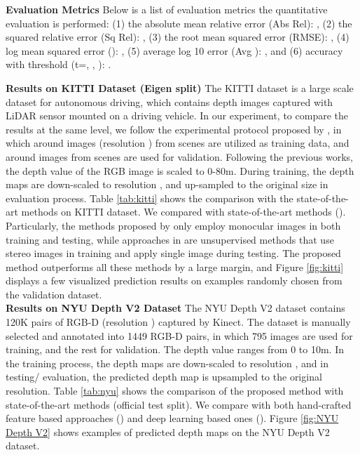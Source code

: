 \documentclass[letterpaper]{article} \usepackage{aaai20}  \usepackage{times}  \usepackage{helvet} \usepackage{courier}  \usepackage{graphicx} \frenchspacing  \setlength{\pdfpagewidth}{8.5in}  \setlength{\pdfpageheight}{11in}  \usepackage{epsfig}
\begin{document}
    \textbf{Evaluation Metrics} \hspace{0.3cm} Below is a list of evaluation metrics the quantitative evaluation is performed: 
    (1) the absolute mean relative error (Abs Rel): ,
    (2) the squared relative error (Sq Rel): ,
    (3) the root mean squared error (RMSE): ,
    (4) log mean squared error (): , 
    (5) average log 10 error (Avg ): , and
    (6) accuracy with threshold  (t=, , ): .
    
     \textbf{Results on KITTI Dataset  (Eigen split)} \hspace{0.3cm} The KITTI dataset is a large scale dataset for autonomous driving, which contains depth images captured with LiDAR sensor mounted on a driving vehicle. In our experiment, to compare the results at the same level, we follow the experimental protocol proposed by \cite{Eigen2015Predicting}, in which around  images (resolution ) from  scenes are utilized as training data, and around  images from  scenes are used for validation. Following the previous works, the depth value of the RGB image is scaled to 0-80m. During training, the depth maps are down-scaled to resolution , and up-sampled to the original size in evaluation process. Table \ref{tab:kitti} shows the comparison with the state-of-the-art methods on KITTI dataset. We compared with state-of-the-art methods (\cite{Saxena2009Make3D,Liu2015Deep,Zhou2017Unsupervised,Eigen2014Depth,Garg2016Unsupervised,Kundu2018AdaDepth,Zhan2018Unsupervised,Godard2017Unsupervised,Kuznietsov2017Semi}). Particularly, the  methods proposed by \cite{Saxena2009Make3D,Liu2015Deep,Zhou2017Unsupervised,Eigen2014Depth,Kundu2018AdaDepth} only employ monocular images in both training and testing, while approaches in  \cite{Zhan2018Unsupervised,Garg2016Unsupervised,Kuznietsov2017Semi,Godard2017Unsupervised} are unsupervised methods that use stereo images in training and apply single image during testing. The proposed method outperforms all these methods by a large margin, and Figure \ref{fig:kitti} displays a few visualized prediction results on examples randomly chosen from the validation dataset.\\
    \indent\textbf{Results on NYU Depth V2 Dataset} \hspace{0.3cm} The NYU Depth V2 dataset contains 120K pairs of RGB-D (resolution ) captured by Kinect. The dataset is manually selected and annotated into 1449 RGB-D pairs, in which 795 images are used for training, and the rest for validation. The depth value ranges from 0 to 10m. In the training process, the depth maps are down-scaled to resolution , and in testing/ evaluation, the predicted depth map is upsampled to the original resolution. Table \ref{tab:nyu} shows the comparison of the proposed method with state-of-the-art methods (official test split). We compare with both hand-crafted feature based approaches (\cite{Saxena2009Make3D,Kevin2012Depth,Shi2014Pulling}) and deep learning based ones (\cite{Liu2014Discrete,Zhuo2015Indoor,Li2015Depth,Wang2015Towards,Xu2018PAD,Liu2016Learning,Roy2016Monocular}). Figure \ref{fig:NYU Depth V2} shows examples of predicted depth maps on the NYU Depth V2 dataset.
    
\end{document}
